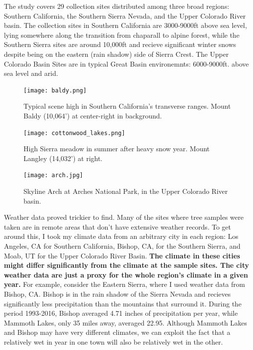 \documentclass[]{article}
\begin{document}
The study covers 29 collection sites distributed among three broad regions: Southern California, the Southern Sierra Nevada, and the Upper Colorado River basin. The collection sites in Southern California are 3000-9000ft above sea level, lying somewhere along the transition from chaparall to alpine forest, while the Southern Sierra sites are around 10,000ft and recieve significant winter snows despite being on the eastern (rain shadow) side of Sierra Crest. The Upper Colorado Basin Sites are in typical Great Basin environemnts: 6000-9000ft. above sea level and arid. 

\begin{figure}
	\centering
	\texttt{[image: baldy.png]}
	\caption{Typical scene high in Southern California's transverse ranges. Mount Baldy (10,064') at center-right in background\cite{me}.}
	\label{fig:baldy}
\end{figure}

\begin{figure}
	\centering
	\texttt{[image: cottonwood\_lakes.png]}
	\caption{High Sierra meadow in summer after heavy snow year. Mount Langley (14,032') at right\cite{me}.}
	\label{fig:cottonwood}
\end{figure}

\begin{figure}
	\centering
	\texttt{[image: arch.jpg]}
	\caption{Skyline Arch at Arches National Park, in the Upper Colorado River basin\cite{arch_pic}.}
	\label{fig:arch}
\end{figure}

Weather data proved trickier to find. Many of the sites where tree samples were taken are in remote areas that don't have extensive weather records. To get around this, I took my climate data from an arbitrary city in each region: Los Angeles, CA for Southern California, Bishop, CA, for the Southern Sierra, and Moab, UT for the Upper Colorado River Basin. \textbf{The climate in these cities might differ significantly from the climate at the sample sites.  The city weather data are just a proxy for the whole region's climate in a given year.} For example, consider the Eastern Sierra, where I used weather data from Bishop, CA. Bishop is in the rain shadow of the Sierra Nevada and recieves significantly less precipitation than  the mountains that surround it. During the period 1993-2016, Bishop averaged 4.71 inches of precipitation per year,  while Mammoth Lakes, only 35 miles away, averaged 22.95. Although Mammoth Lakes and Bishop may have very different climates, we can exploit the fact that a relatively wet in year in one town will also be relatively wet in the other. 
\end{document}
